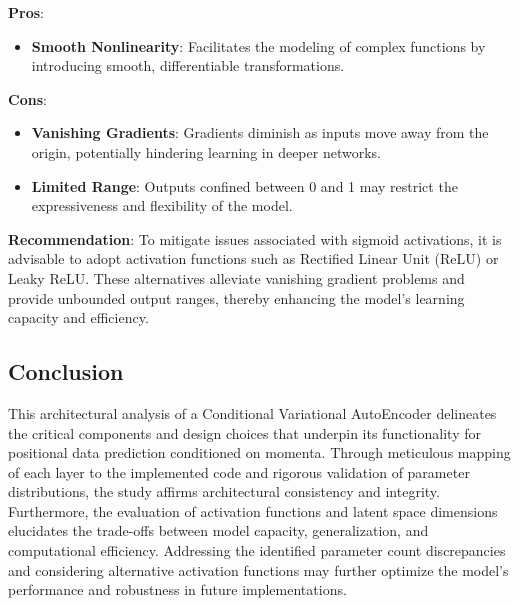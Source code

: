 \documentclass[10pt]{article}
\begin{document}
\textbf{Pros}:

\begin{itemize}
    \item \textbf{Smooth Nonlinearity}: Facilitates the modeling of complex functions by introducing smooth, differentiable transformations.
\end{itemize}

\textbf{Cons}:

\begin{itemize}
    \item \textbf{Vanishing Gradients}: Gradients diminish as inputs move away from the origin, potentially hindering learning in deeper networks.
    \item \textbf{Limited Range}: Outputs confined between 0 and 1 may restrict the expressiveness and flexibility of the model.
\end{itemize}

\textbf{Recommendation}: To mitigate issues associated with sigmoid activations, it is advisable to adopt activation functions such as Rectified Linear Unit (ReLU) or Leaky ReLU. These alternatives alleviate vanishing gradient problems and provide unbounded output ranges, thereby enhancing the model's learning capacity and efficiency.

\subsection{Conclusion}

This architectural analysis of a Conditional Variational AutoEncoder delineates the critical components and design choices that underpin its functionality for positional data prediction conditioned on momenta. Through meticulous mapping of each layer to the implemented code and rigorous validation of parameter distributions, the study affirms architectural consistency and integrity. Furthermore, the evaluation of activation functions and latent space dimensions elucidates the trade-offs between model capacity, generalization, and computational efficiency. Addressing the identified parameter count discrepancies and considering alternative activation functions may further optimize the model's performance and robustness in future implementations.
\end{document}
